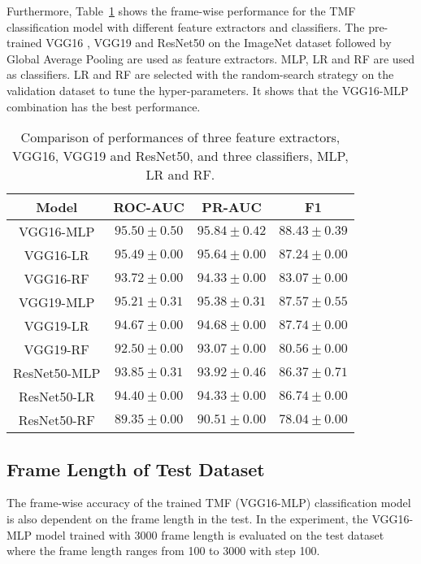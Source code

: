 \documentclass[journal]{IEEEtran}
\begin{document}
Furthermore, Table~\ref{tab:result-net-classifier} shows the frame-wise performance for the TMF classification model with different feature extractors and classifiers. 
The pre-trained VGG16 \cite{vgg_2015}, VGG19 \cite{vgg_2015} and ResNet50 \cite{ResNet_2016} on the ImageNet dataset followed by Global Average Pooling are used as feature extractors. MLP, LR and RF are used as classifiers. 
LR and RF are selected with the random-search strategy on the validation dataset to tune the hyper-parameters. It shows that the VGG16-MLP combination has the best performance.

\begin{table}[H]
  \caption{Comparison of performances of three feature extractors, VGG16, VGG19 and ResNet50, and three classifiers, MLP, LR and RF.}
  \centering
  \begin{tabular}{cccc}
  \hline
  Model     &   ROC-AUC   &   PR-AUC  &  F1  \\ 
  \hline
  VGG16-MLP &  $\mathbf{95.50}\pm0.50$   &  $\mathbf{95.84}\pm0.42$   & $\mathbf{88.43}\pm0.39$\\
  VGG16-LR &   $95.49\pm0.00$   &  $95.64\pm0.00$   & $87.24\pm0.00$\\
  VGG16-RF &   $93.72\pm0.00$   &  $94.33\pm0.00$   & $83.07\pm0.00$\\
  \hline
  VGG19-MLP&   $95.21\pm0.31$   &  $95.38\pm0.31$   & $87.57\pm0.55$\\
  VGG19-LR &   $94.67\pm0.00$   &  $94.68\pm0.00$   & $87.74\pm0.00$\\
  VGG19-RF &   $92.50\pm0.00$   &  $93.07\pm0.00$   & $80.56\pm0.00$\\
  \hline
  ResNet50-MLP &  $93.85\pm0.31$   &  $93.92\pm0.46$   & $86.37\pm0.71$\\
  ResNet50-LR &   $94.40\pm0.00$   &  $94.33\pm0.00$   & $86.74\pm0.00$\\
  ResNet50-RF &   $89.35\pm0.00$   &  $90.51\pm0.00$   & $78.04\pm0.00$\\
  \hline
  \end{tabular}
  \label{tab:result-net-classifier}
\end{table}

\subsection{Frame Length of Test Dataset}

The frame-wise accuracy of the trained TMF (VGG16-MLP) classification model is also dependent on the frame length in the test. In the experiment, the VGG16-MLP model trained with 3000 frame length is evaluated on the test dataset where the frame length ranges from 100 to 3000 with step 100. 
\end{document}
